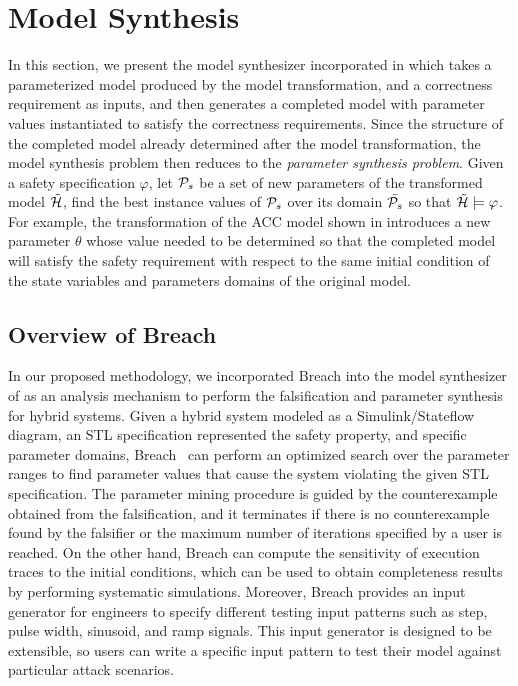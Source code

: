 \section{Model Synthesis}
%
In this section, we present the model synthesizer incorporated in \toolreaffirm which takes a parameterized model produced by the model transformation, and a correctness requirement as inputs, and then generates a completed model with parameter values instantiated to satisfy the correctness requirements. Since the structure of the completed model already determined after the model transformation, the model synthesis problem then reduces to the \emph{parameter synthesis problem}. Given a safety specification $\varphi$, let $\P_s$ be a set of new parameters of the transformed model $\tilde{\AutomatonH}$, find the best instance values of $\P_s$ over its domain $\bar{\P_s}$ so that $\tilde{\AutomatonH} \models\varphi$.  
%
For example, the transformation of the ACC model shown in  introduces a new parameter $\theta$ whose value needed to be determined so that the completed model will satisfy the safety requirement with respect to the same initial condition of the state variables and parameters domains of the original model.
%
%
\subsection{Overview of Breach}
%
%
In our proposed methodology, we incorporated Breach into the model synthesizer of \toolreaffirm as an analysis mechanism to perform the falsification and parameter synthesis for hybrid systems. Given a hybrid system modeled as a Simulink/Stateflow diagram, an STL specification represented the safety property, and specific parameter domains, Breach~\cite{donze2010breach} can perform an optimized search over the parameter ranges to find parameter values that cause the system violating the given STL specification. 
%
%
The parameter mining procedure is guided by the counterexample obtained from the falsification, and it terminates if there is no counterexample found by the falsifier or the maximum number of iterations specified by a user is reached.
%
On the other hand, Breach can compute the sensitivity of execution traces to the initial conditions, which can be used to obtain completeness results by performing systematic simulations. Moreover, Breach provides an input generator for engineers to specify different testing input patterns such as step, pulse width, sinusoid, and ramp signals. This input generator is designed to be extensible, so users can write a specific input pattern to test their model against particular attack scenarios.


